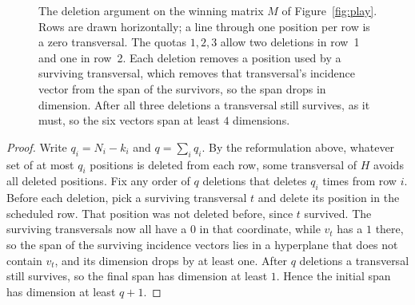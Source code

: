 \documentclass[11pt]{article}
\theoremstyle{definition}
\theoremstyle{remark}
\begin{document}
\begin{figure}[ht]
\caption{The deletion argument on the winning matrix $M$ of Figure~\ref{fig:play}. Rows are drawn horizontally; a line through one position per row is a zero transversal. The quotas $1,2,3$ allow two deletions in row~1 and one in row~2. Each deletion removes a position used by a surviving transversal, which removes that transversal's incidence vector from the span of the survivors, so the span drops in dimension. After all three deletions a transversal still survives, as it must, so the six vectors span at least $4$ dimensions.}
\label{fig:delete}
\end{figure}

\begin{proof}
Write $q_i=N_i-k_i$ and $q=\sum_iq_i$. By the reformulation above, whatever set of at most $q_i$ positions is deleted from each row, some transversal of $H$ avoids all deleted positions. Fix any order of $q$ deletions that deletes $q_i$ times from row $i$. Before each deletion, pick a surviving transversal $t$ and delete its position in the scheduled row. That position was not deleted before, since $t$ survived. The surviving transversals now all have a $0$ in that coordinate, while $v_t$ has a $1$ there, so the span of the surviving incidence vectors lies in a hyperplane that does not contain $v_t$, and its dimension drops by at least one. After $q$ deletions a transversal still survives, so the final span has dimension at least $1$. Hence the initial span has dimension at least $q+1$.
\end{proof}
\end{document}
